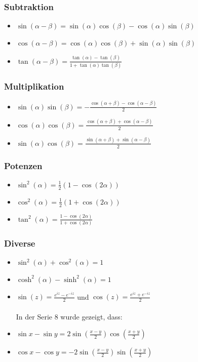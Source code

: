 \documentclass[a4paper,fontsize = 7pt]{scrartcl}
\begin{document}
\subsubsection{Subtraktion}
\begin{itemize}
 \item $\sin(\alpha - \beta) = \sin(\alpha) \cos(\beta) - \cos(\alpha)\sin(\beta)$
 \item $\cos(\alpha - \beta) = \cos(\alpha) \cos(\beta) + \sin(\alpha)\sin(\beta)$
 \item $\tan(\alpha - \beta) = \frac{\tan(\alpha) - \tan(\beta)}{1+\tan(\alpha) \tan(\beta)}$
\end{itemize}

\subsubsection{Multiplikation}
\begin{itemize}
 \item $\sin(\alpha) \sin(\beta) = -\frac{\cos(\alpha + \beta) - \cos(\alpha - \beta)}{2}$
 \item $\cos(\alpha) \cos(\beta) =  \frac{\cos(\alpha + \beta) + \cos(\alpha - \beta)}{2}$
 \item $\sin(\alpha) \cos(\beta) =  \frac{\sin(\alpha + \beta) + \sin(\alpha - \beta)}{2}$
\end{itemize}

\subsubsection{Potenzen}
\begin{itemize}
 \item $\sin^2(\alpha) = \frac{1}{2}(1-\cos(2\alpha))$
 \item $\cos^2(\alpha) = \frac{1}{2}(1+\cos(2\alpha))$
 \item $\tan^2(\alpha) = \frac{1-\cos(2\alpha)}{1+\cos(2\alpha)}$
\end{itemize}

\subsubsection{Diverse}

\begin{itemize}
 \item $\sin^2(\alpha) + \cos^2(\alpha) = 1$
 \item $\cosh^2(\alpha) - \sinh^2(\alpha) = 1$
 \item $\sin(z) = \frac{e^{iz} - e^{-iz}}{2}$ und $\cos(z) = \frac{e^{iz} + e^{-iz}}{2}$
 \\ \\In der Serie 8 wurde gezeigt, dass:
 \item $\sin x - \sin y = 2\sin\left(\frac{x-y}{2}\right)\cos\left(\frac{x+y}{2}\right)$
 \item $\cos x -\cos y = -2\sin\left(\frac{x-y}{2}\right)\sin\left(\frac{x+y}{2}\right)$
\end{itemize}
\end{document}
